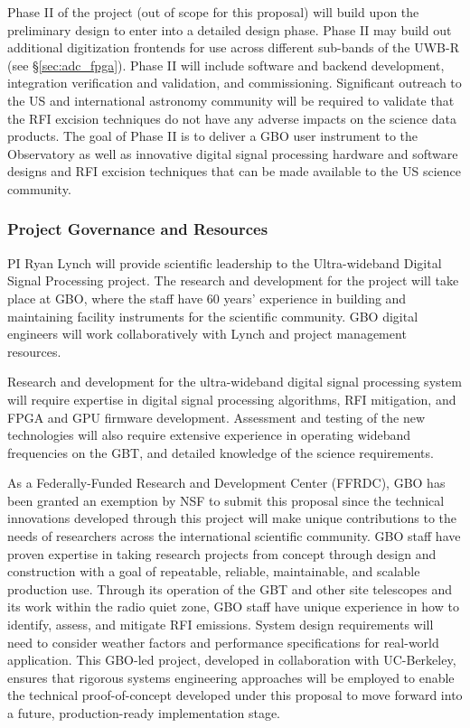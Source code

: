 \documentclass[10pt]{myNSF}
\begin{document}
Phase {\sc II} of the project (out of scope for this proposal) will
build upon the preliminary design to enter into a detailed design
phase. Phase {\sc II} may build out additional digitization frontends
for use across different sub-bands of the UWB-R (see
\S\ref{sec:adc_fpga}). Phase {\sc II} will include software and
backend development, integration verification and validation, and
commissioning. Significant outreach to the US and international
astronomy community will be required to validate that the RFI excision
techniques do not have any adverse impacts on the science data
products. The goal of Phase {\sc II} is to deliver a GBO user
instrument to the Observatory as well as innovative digital signal
processing hardware and software designs and RFI excision techniques
that can be made available to the US science community.

\subsubsection{Project Governance and Resources}
\label{sec:governance}

\label{sec:team}

PI Ryan Lynch will provide scientific leadership to the Ultra-wideband
Digital Signal Processing project. The research and development for
the project will take place at GBO, where the staff have 60 years'
experience in building and maintaining facility instruments for the
scientific community. GBO digital engineers will work collaboratively
with Lynch and project management resources.

Research and development for the ultra-wideband digital signal
processing system will require expertise in digital signal processing
algorithms, RFI mitigation, and FPGA and GPU firmware
development. Assessment and testing of the new technologies will also
require extensive experience in operating wideband frequencies on the GBT,
and detailed knowledge of the science requirements.

As a Federally-Funded Research and Development Center (FFRDC), GBO has
been granted an exemption by NSF to submit this proposal since the
technical innovations developed through this project will make unique
contributions to the needs of researchers across the international
scientific community. GBO staff have proven expertise in taking
research projects from concept through design and construction with a
goal of repeatable, reliable, maintainable, and scalable production
use. Through its operation of the GBT and other site telescopes and
its work within the radio quiet zone, GBO staff have unique experience
in how to identify, assess, and mitigate RFI emissions. System design
requirements will need to consider weather factors and performance
specifications for real-world application. This GBO-led project,
developed in collaboration with UC-Berkeley, ensures that rigorous
systems engineering approaches will be employed to enable the
technical proof-of-concept developed under this proposal to move
forward into a future, production-ready implementation stage.
\end{document}
